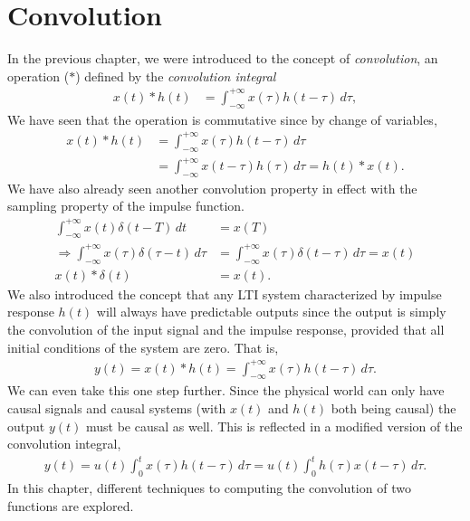 \documentclass{report}
\begin{document}
\setcounter{chapter}{2}
\setcounter{page}{34}
\chapter{Convolution}
In the previous chapter, we were introduced to the concept of \emph{convolution}, an operation ($*$) defined by the \emph{convolution integral}
\begin{align*}
    x(t) * h(t) &= \int_{-\infty}^{+\infty} x(\tau)h(t-\tau) \,d\tau,
\end{align*}
We have seen that the operation is commutative since by change of variables, 
\begin{align*}
    x(t) * h(t) &= \int_{-\infty}^{+\infty} x(\tau)h(t-\tau) \,d\tau \\
    &= \int_{-\infty}^{+\infty} x(t-\tau)h(\tau) \,d\tau = h(t) * x(t).
\end{align*}
We have also already seen another convolution property in effect with the sampling property of the impulse function. 
\begin{align*}
    \int_{-\infty}^{+\infty} x(t)\delta(t-T) \,dt &= x(T) \\
    \Longrightarrow \int_{-\infty}^{+\infty} x(\tau)\delta(\tau-t) \,d\tau &= \int_{-\infty}^{+\infty} x(\tau)\delta(t-\tau) \,d\tau = x(t) \\
    x(t) * \delta(t) &= x(t).
\end{align*}
We also introduced the concept that any LTI system characterized by impulse response $h(t)$ will always have predictable outputs since the output is simply the 
convolution of the input signal and the impulse response, provided that all initial conditions of the system are zero. That is, 
\begin{align}
    y(t) = x(t) * h(t) = \int_{-\infty}^{+\infty} x(\tau)h(t-\tau) \,d\tau.
\end{align}
We can even take this one step further. Since the physical world can only have causal signals and causal systems (with $x(t)$ and $h(t)$ both being causal) the output $y(t)$ must be causal as well. 
This is reflected in a modified version of the convolution integral, 
\begin{align}
    y(t) = u(t) \int_{0}^{t} x(\tau)h(t-\tau) \,d\tau = u(t) \int_{0}^{t} h(\tau)x(t-\tau) \,d\tau.
\end{align}
In this chapter, different techniques to computing the convolution of two functions are explored. 
\end{document}
